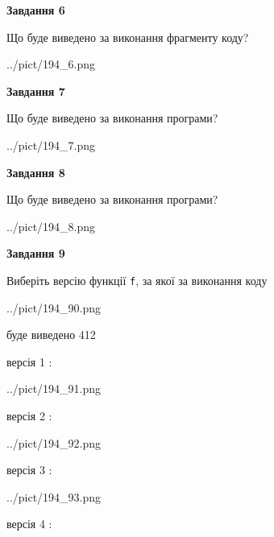 \documentclass[12pt, ukrainian]{article}
\def\code#1{\Verb!#1!}
\begin{document}
{\begin {large}
{\begin {center}\textbf{Завдання 6}\end {center}}

Що буде виведено за виконання фрагменту коду?\par
\begin{center}
	{../pict/194_6.png}
\end{center}
\newpage

{\begin {center}\textbf{Завдання 7}\end {center}}

Що буде виведено за виконання програми?\par
\begin{center}
	{../pict/194_7.png}
\end{center}
\newpage

{\begin {center}\textbf{Завдання 8}\end {center}}

Що буде виведено за виконання програми?\par
\begin{center}
	{../pict/194_8.png}
\end{center}
\newpage

{\begin {center}\textbf{Завдання 9}\end {center}}

Виберіть версію функції \code{f}, за якої за виконання коду
\begin{center}
	{../pict/194_90.png}
\end{center}
буде виведено 412

\vspace{5mm}
версія 1 :

\begin{center}
	{../pict/194_91.png}
\end{center}
версія 2 :

\begin{center}
	{../pict/194_92.png}
\end{center}
версія 3 :

\begin{center}
	{../pict/194_93.png}
\end{center}
версія 4 :


\end{large}}
\end{document}
